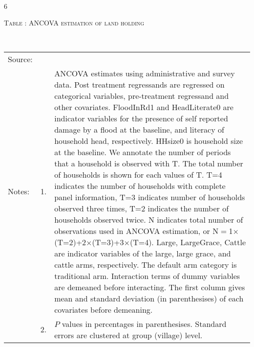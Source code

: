 \begin{Schunk}
\begin{Soutput}
[1] 6
\end{Soutput}
\end{Schunk}



\hspace{-1cm}\begin{minipage}[t]{14cm}
\hfil\textsc{\normalsize Table \thetable: ANCOVA estimation of land holding\label{tab ANCOVA land}}\\
\setlength{\tabcolsep}{1pt}
\setlength{\baselineskip}{8pt}
\renewcommand{\arraystretch}{.55}
\hfil{}\\
\renewcommand{\arraystretch}{.8}
\setlength{\tabcolsep}{1pt}
\begin{tabular}{>{\hfill\scriptsize}p{1cm}<{}>{\hfill\scriptsize}p{.25cm}<{}>{\scriptsize}p{12cm}<{\hfill}}
Source:& \multicolumn{2}{l}{\scriptsize Estimated with GUK administrative and survey data.}\\
Notes: & 1. & ANCOVA estimates using administrative and survey data. Post treatment regressands are regressed on categorical variables, pre-treatment regressand and other covariates. \textsf{FloodInRd1} and \textsf{HeadLiterate0} are indicator variables for the presence of self reported damage by a flood at the baseline, and literacy of household head, respectively. \textsf{HHsize0} is household size at the baseline. We annotate the number of periods that a household is observed with \textsf{T}. The total number of households is shown for each values of \textsf{T}. \textsf{T=4} indicates the number of households with complete panel information, \textsf{T=3} indicates number of households observed three times, \textsf{T=2} indicates the number of households observed twice. \textsf{N} indicates total number of observations used in ANCOVA estimation, or \textsf{N$=$1$\times$(T=2)+2$\times$(T=3)+3$\times$(T=4)}.  \textsf{Large}, \textsf{LargeGrace}, \textsf{Cattle} are indicator variables of the \textsf{large}, \textsf{large grace}, and \textsf{cattle} arms, respectively. The default arm category is \textsf{traditional} arm. Interaction terms of dummy variables are demeaned before interacting. The first column gives mean and standard deviation (in parenthesises) of each covariates before demeaning.\\
& 2. & $P$ values in percentages in parenthesises. Standard errors are clustered at group (village) level.
\end{tabular}
\end{minipage}

